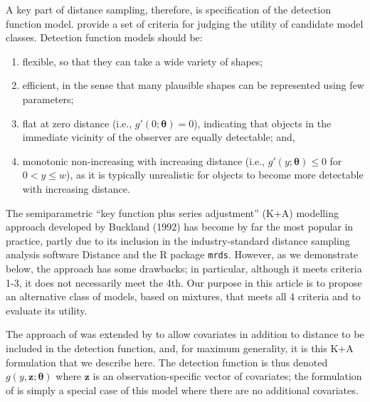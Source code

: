 \documentclass[useAMS,referee,usenatbib]{biom}
\begin{document}
A key part of distance sampling, therefore, is specification of the detection function model.  \citet[][Chapter 2]{Buckland:2001vm} provide a set of criteria for judging the utility of candidate model classes. Detection function models should be:
\begin{enumerate}
\item flexible, so that they can take a wide variety of shapes;
\item efficient, in the sense that many plausible shapes can be represented using few parameters;
\item flat at zero distance (i.e., $g'(0;\bm{\theta})=0$), indicating that objects in the immediate vicinity of the observer are equally detectable; and,
\item monotonic non-increasing with increasing distance (i.e., $g'(y;\bm{\theta}) \leq 0$ for $0<y\leq w$), as it is typically unrealistic for objects to become more detectable with increasing distance.
\end{enumerate}
The semiparametric ``key function plus series adjustment'' (K+A) modelling approach developed by Buckland (1992) has become by far the most popular in practice, partly due to its inclusion in the industry-standard distance sampling analysis software Distance \citep{Thomas:2010cf} and the \textsf{R} package \texttt{mrds}.  However, as we demonstrate below, the approach has some drawbacks; in particular, although it meets criteria 1-3, it does not necessarily meet the 4th.  Our purpose in this article is to propose an alternative class of models, based on mixtures, that meets all 4 criteria and to evaluate its utility.  

The approach of \cite{Buckland:1992wy} was extended by \cite{Marques:2003vb} to allow covariates in addition to distance to be included in the detection function, and, for maximum generality, it is this K+A formulation that we describe here.  The detection function is thus denoted $g(y, \mathbf{z};\bm{\theta})$ where $\mathbf{z}$ is an observation-specific vector of covariates; the formulation of \cite{Buckland:1992wy} is simply a special case of this model where there are no additional covariates. 
\end{document}
